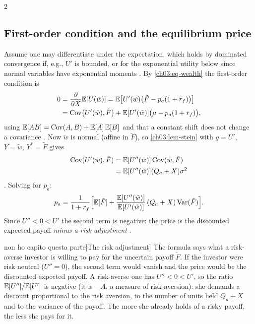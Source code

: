 \begin{paracol}{2}
\subsection{First-order condition and the equilibrium price}
Assume one may differentiate under the expectation, which holds by
dominated convergence if, e.g., $U'$ is bounded, or for the exponential
utility below since normal variables have exponential moments
. By \eqref{ch03:eq-wealth} the first-order
condition is
\begin{align*}
  0&=\frac{\partial}{\partial X}\mathbb{E}[U(\tilde w)]
  =\mathbb{E}\bigl[U'(\tilde w)\bigl(\tilde F-p_a(1+r_f)\bigr)\bigr] \\
   &=\operatorname{Cov}\bigl(U'(\tilde w),\tilde F\bigr)
   +\mathbb{E}[U'(\tilde w)]\bigl(\mu-p_a(1+r_f)\bigr),
\end{align*}
using $\mathbb{E}[AB]=\operatorname{Cov}(A,B)+\mathbb{E}[A]\,\mathbb{E}[B]$ and that a constant shift does not
change a covariance . Now $\tilde w$ is normal (affine
in $\tilde F$), so \cref{ch03:lem-stein} with $g=U'$, $Y=\tilde w$,
$Y^*=\tilde F$ gives
\begin{align*}
  \operatorname{Cov}(U'(\tilde w),\tilde F)&=\mathbb{E}[U''(\tilde w)]\operatorname{Cov}(\tilde w,\tilde F)\\
  &=\mathbb{E}[U''(\tilde w)](Q_a+X)\sigma^2
\end{align*}
. Solving for $p_a$:
\begin{equation}\label{ch03:eq-price1}
  p_a=\frac{1}{1+r_f}\Bigl[\mathbb{E}[\tilde F]
  +\frac{\mathbb{E}[U''(\tilde w)]}{\mathbb{E}[U'(\tilde w)]}\,(Q_a+X)\operatorname{Var}(\tilde F)\Bigr].
\end{equation}
Since $U''<0<U'$ the second term is negative: the price is the
discounted expected payoff \emph{minus a risk adjustment}
.\begin{answer}{non ho capito questa parte}[The risk adjustment]
The formula says what a risk-averse investor is willing to pay for the uncertain payoff $\tilde F$. If the investor were risk neutral
($U''=0$), the second term would vanish and the price would be the discounted expected payoff. A risk-averse one has $U''<0<U'$, so the ratio
$\mathbb{E}[U'']/\mathbb{E}[U']$ is negative (it is $-A$, a measure of risk aversion): she demands a discount proportional to the risk aversion, to the number of units held
$Q_a+X$ and to the variance of the payoff. The more she already holds of a risky payoff, the less she pays for it.
\end{answer}


\end{paracol}

